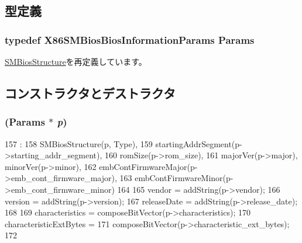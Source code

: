 \subsection{型定義}
\hypertarget{classX86ISA_1_1SMBios_1_1BiosInformation_a80894fc0e6b20b3b6808ca61edf19aa1}{
\subsubsection[{Params}]{\setlength{\rightskip}{0pt plus 5cm}typedef X86SMBiosBiosInformationParams {\bf Params}}}
\label{classX86ISA_1_1SMBios_1_1BiosInformation_a80894fc0e6b20b3b6808ca61edf19aa1}


\hyperlink{classX86ISA_1_1SMBios_1_1SMBiosStructure_a55e55a28dd1c31e4bbc87e379625f1b5}{SMBiosStructure}を再定義しています。

\subsection{コンストラクタとデストラクタ}
\hypertarget{classX86ISA_1_1SMBios_1_1BiosInformation_aabfbb88f8bc8fdd4dbe37677c4049432}{
\subsubsection[{BiosInformation}]{ ({\bf Params} $\ast$ {\em p})}}
\label{classX86ISA_1_1SMBios_1_1BiosInformation_aabfbb88f8bc8fdd4dbe37677c4049432}



\begin{DoxyCode}
157                                                        :
158         SMBiosStructure(p, Type),
159         startingAddrSegment(p->starting_addr_segment),
160         romSize(p->rom_size),
161         majorVer(p->major), minorVer(p->minor),
162         embContFirmwareMajor(p->emb_cont_firmware_major),
163         embContFirmwareMinor(p->emb_cont_firmware_minor)
164     {
165         vendor = addString(p->vendor);
166         version = addString(p->version);
167         releaseDate = addString(p->release_date);
168 
169         characteristics = composeBitVector(p->characteristics);
170         characteristicExtBytes =
171             composeBitVector(p->characteristic_ext_bytes);
172     }

\end{DoxyCode}


